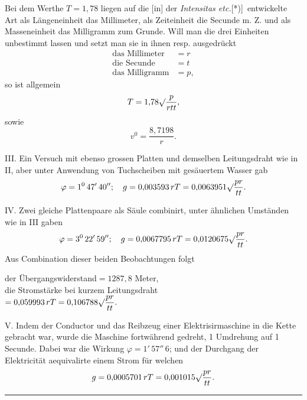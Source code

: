 Bei dem Werthe $T=1{,}78$ liegen auf die [in] der \textit{Intensitas etc.}[*)]\begingroup\renewcommand{\thefootnote}{}\endgroup\ entwickelte Art als Längeneinheit das Millimeter, als Zeiteinheit die Secunde m. Z. und als Masseneinheit das Milligramm zum Grunde. Will man die drei Einheiten unbestimmt lassen und setzt man sie in ihnen resp. ausgedrückt
\[
\begin{array}{lr}
\text{das Millimeter}&=r\\
\text{die Secunde}&=t\\
\text{das Milligramm}&=p,
\end{array}
\]
\noindent so ist allgemein
\[
T=1{,}78\surd\frac{p}{rtt},
\]
\noindent sowie
\[
v^0=\frac{8{,}7198}{r}.
\]

III. Ein Versuch mit ebenso grossen Platten und demselben Leitungsdraht wie in II, aber unter Anwendung von Tuchscheiben mit gesäuertem Wasser gab
\[
\varphi=1^0\,47'\,40'';\quad g=0{,}003593\,rT=0{,}0063951\surd\frac{pr}{tt}.
\]

IV. Zwei gleiche Plattenpaare als Säule combinirt, unter ähnlichen Umständen wie in III gaben
\[
\varphi=3^0\,22'\,59'';\quad g=0{,}0067795\,rT=0{,}0120675\surd\frac{pr}{tt}.
\]
\noindent Aus Combination dieser beiden Beobachtungen folgt
\begin{flushleft}
der Übergangswiderstand\hfill $=1287{,}8$ Meter,\\[4pt]
die Stromstärke bei kurzem Leitungsdraht\\[2pt]
\hfill $=0{,}059993\,rT=0{,}106788\surd\dfrac{pr}{tt}.$
\end{flushleft}
\clearpage{}
\noindent\hspace*{\parindent}V. Indem der Conductor und das Reibzeug einer Elektrisirmaschine in die Kette gebracht war, wurde die Maschine fortwährend gedreht, 1 Umdrehung auf 1 Secunde. Dabei war die Wirkung $\varphi=1'\,57''\,6$; und der Durchgang der Elektricität aequivalirte einem Strom für welchen
\[
g=0{,}0005701\,rT=0{,}001015\surd\frac{pr}{tt}.
\]
\begin{center}\rule{.18\textwidth}{.35pt}\end{center}
\clearpage\endgroup
